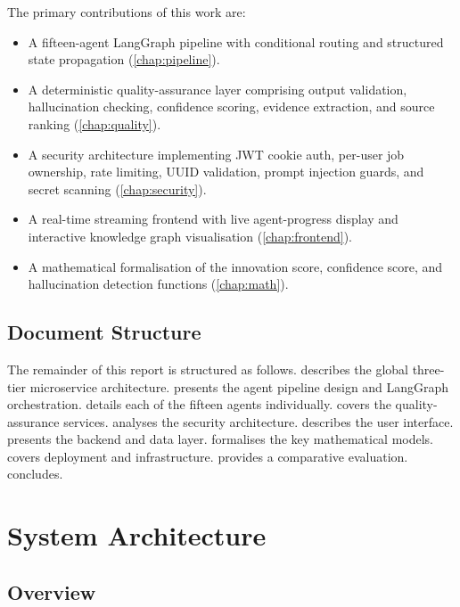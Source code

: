 \documentclass[12pt,a4paper,oneside]{book}
\begin{document}
The primary contributions of this work are:

\begin{itemize}
  \item A fifteen-agent LangGraph pipeline with conditional routing and structured state propagation (\cref{chap:pipeline}).
  \item A deterministic quality-assurance layer comprising output validation, hallucination checking, confidence scoring, evidence extraction, and source ranking (\cref{chap:quality}).
  \item A security architecture implementing JWT cookie auth, per-user job ownership, rate limiting, UUID validation, prompt injection guards, and secret scanning (\cref{chap:security}).
  \item A real-time streaming frontend with live agent-progress display and interactive knowledge graph visualisation (\cref{chap:frontend}).
  \item A mathematical formalisation of the innovation score, confidence score, and hallucination detection functions (\cref{chap:math}).
\end{itemize}

\section{Document Structure}

The remainder of this report is structured as follows.  describes the global three-tier microservice architecture.  presents the agent pipeline design and LangGraph orchestration.  details each of the fifteen agents individually.  covers the quality-assurance services.  analyses the security architecture.  describes the user interface.  presents the backend and data layer.  formalises the key mathematical models.  covers deployment and infrastructure.  provides a comparative evaluation.  concludes.

\chapter{System Architecture}
\label{chap:architecture}

\section{Overview}
\end{document}
